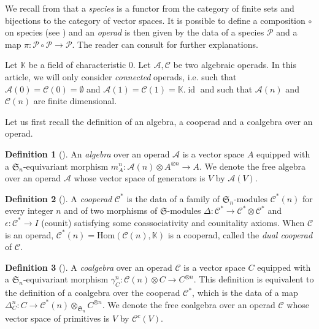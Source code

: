 \documentclass[11pt,leqno]{amsart}
\theoremstyle{definition}
\newtheorem{definition}{Definition}[subsection]
\theoremstyle{plain}
\def\Hom{\mathrm{Hom}}
\newcommand{\A}{ \mathcal{A} }
\newcommand{\C}{ \mathcal{C} }
\newcommand{\K}{ \mathbb{K} }
\begin{document}
We recall from \cite{Joyal86} that a \emph{species} is a functor from the category of finite sets and bijections to the category of vector spaces. It is possible to define a composition $\circ$ on species (see \cite{BLL}) and an \emph{operad} is then given by the data of a species $\mathcal{P}$ and a map $\pi: \mathcal{P} \circ \mathcal{P} \rightarrow \mathcal{P}$. The reader can consult \cite{Operads} for further explanations. 

Let  $\K$ be a field of characteristic $0$. Let $\mathcal A, \mathcal C$ be two algebraic operads. In this article, we will only consider \emph{connected} operads, i.e. such that $\A(0)=\C(0)=\emptyset$ and $\A(1)=\C(1)=\K.\operatorname{id}$ and such that $\A(n)$ and $\C(n)$ are  finite dimensional.


Let us first recall the definition of an algebra, a cooperad and a coalgebra over an operad.
\begin{definition}[\cite{Operads}] \label{defcog}An \emph{algebra} over an operad $\A$ is a vector space $A$ equipped with a $\mathfrak{S}_n$-equivariant morphism $m^n_A: \A(n) \otimes A^{\otimes n} \rightarrow A $. We denote the free algebra over an operad $\A$ whose vector space of generators is $V$ by $\A(V)$.
\end{definition}


\begin{definition}[\cite{Operads}] 
A \emph{cooperad} $\C^*$ is the data of a family of $\mathfrak{S}_n$-modules $\C^*(n)$ for every integer $n$ and of two morphisms of $\mathfrak{S}$-modules $\Delta: \C^* \rightarrow \C^* \otimes \C^*$ and $\epsilon: \C^* \rightarrow I$ (counit) satisfying some coassociativity and counitality axioms.
When $\C$ is an operad, $\C^*(n)=\Hom(\C(n), \K)$ is a cooperad, called the \emph{dual cooperad} of $\C$.
\end{definition}

\begin{definition}[\cite{Operads}] \label{defcog}A \emph{coalgebra} over an operad $\C$ is a vector space $C$ equipped with a $\mathfrak{S}_n$-equivariant morphism $\gamma^n_C: \C(n) \otimes C \rightarrow C^{\otimes n} $. This definition is equivalent to the definition of a coalgebra over the cooperad $\C^*$, which is the data of a map $\Delta^n_C: C \rightarrow \C^*(n) \otimes_{\mathfrak{S}_n} C^{\otimes n}$.
We denote the free coalgebra over an operad $\C$ whose vector space of primitives is $V$ by $\C^c(V)$.
\end{definition}
\end{document}
